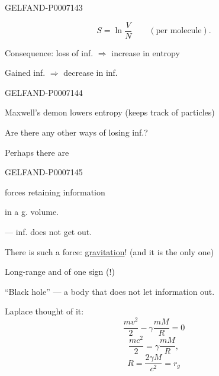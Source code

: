 \begin{GelfandAdjacentEvidence}{GELFAND-P000714}{3}

\[
S=\ln\frac{V}{N}\qquad(\text{per molecule}).
\]
\begin{center}
\begingroup\color{black}\endgroup
\end{center}

Consequence: loss of inf. \(\Rightarrow\) increase in entropy

Gained inf. \(\Rightarrow\) decrease in inf.
\end{GelfandAdjacentEvidence}
\begin{GelfandAdjacentEvidence}{GELFAND-P000714}{4}


Maxwell’s demon lowers entropy (keeps track of particles)

Are there any other ways of losing inf.?

Perhaps there are
\end{GelfandAdjacentEvidence}
\begin{GelfandAdjacentEvidence}{GELFAND-P000714}{5}

forces retaining information
\end{GelfandAdjacentEvidence}

in a g. volume.


--- inf. does not get out.

There is such a force: \underline{gravitation}! (and it is the only one)

Long-range and of one sign (!)

“Black hole” --- a body that does not let information out.

Laplace thought of it: 
\[
\frac{mv^2}{2}-\gamma\frac{mM}{R}=0
\]
\[
\frac{mc^2}{2}=\gamma\frac{mM}{R},
\]
\[
\boxed{R=\frac{2\gamma M}{c^2}=r_g}
\]

